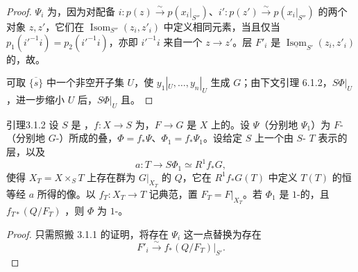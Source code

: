 \begin{proof}
 $\Psi_i$ 为，因为对配备 $i:p(z)\xrightarrow{\sim}p(x_i|_{S''})$、$i':p(z')\xrightarrow{\sim}p(x_i|_{S''})$ 的两个对象 $z,z'$，它们在 $\operatorname{Isom}_{S''}(z_i,z'_i)$ 中定义相同元素，当且仅当 $p_1(i'^{-1}i)=p_2(i'^{-1}i)$，亦即 $i'^{-1}i$ 来自一个 $z\to z'$。层 $F'_i$ 是 $\underline{\operatorname{Isom}}_{S'}(z_i,z'_i)$ 的，故。

可取 $\overline{\{s\}}$ 中一个非空开子集 $U$，使 $y_1|_U,\ldots,y_n|_U$ 生成 $G$；由下文引理 6.1.2，$S\Phi|_U$ ，进一步缩小 $U$ 后，$S\Phi|_U$ 且。
\end{proof}

\begin{SGAresult}{引理}{3.1.2}
设 $S$ 是 ，$f:X\to S$ 为，$F\to G$ 是 $X$ 上的。设 $\Psi$（分别地 $\Psi_1$）为 $F$-（分别地 $G$-）所成的叠，$\Phi=f_*\Psi$、$\Phi_1=f_*\Psi_1$。设给定 $S$ 上一个由 $S$- $T$ 表示的层，以及
\[a:T\longrightarrow S\Phi_1\simeq R^1f_*G,\]
使得 $X_T=X\times_S T$ 上存在群为 $G|_{X_T}$ 的 $Q$，它在 $R^1f_*G(T)$ 中定义 $T(T)$ 的恒等经 $a$ 所得的像。以 $f_T:X_T\to T$ 记典范，置 $F_T=F|_{X_T}$。若 $\Phi_1$ 是 $1$-的，且 $f_{T*}(Q/F_T)$ ，则 $\Phi$ 为 $1$-。
\end{SGAresult}
\begin{proof}
只需照搬 3.1.1 的证明，将存在 $\Psi_i$ 这一点替换为存在
\[F'_i\xrightarrow{\sim}f_*(Q/F_T)|_{S'}.\]
\end{proof}

